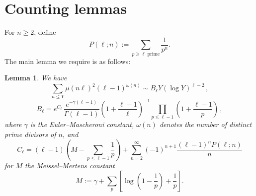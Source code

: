\documentclass[12pt]{amsart}
\newtheorem{lemma}{Lemma}
\begin{document}

\section{Counting lemmas}\label{Lemmas}

For $n \geq 2$, define
\[ P(\ell; n) := \sum_{p \geq \ell \text{ prime}} \frac{1}{p^n}.\] The main lemma we require is as follows:

\begin{lemma}\label{L:sum}
We have
$$
\sum_{n \leq Y} \mu(n\ell)^2(\ell-1)^{\omega(n)}
\sim
B_\ell
Y(\log Y)^{\ell-2}
\,,
$$
$$
  B_\ell=
  e^{C_\ell}\,\frac{e^{-\gamma(\ell-1)}}{\Gamma(\ell-1)} \left( 1 + \frac{\ell-1}{\ell}\right)^{-1} \prod_{p \leq \ell-1} \left( 1 + \frac{\ell-1}{p} \right)
  \,,
$$
where $\gamma$ is the Euler--Mascheroni constant, $\omega(n)$ denotes the number of distinct prime divisors of $n$, and 
\[ C_{\ell}= (\ell-1)\left(M - \sum_{p\leq \ell-1} \frac{1}{p}\right) +\sum_{n=2}^\infty (-1)^{n+1}\frac{(\ell-1)^n P(\ell;n)}{n}\] for $M$ the Meissel--Mertens constant
\[ M:=\gamma+ \sum_p \left[\log\left(1 - \frac{1}{p} \right) + \frac{1}{p} \right].\]
\end{lemma}
\end{document}
